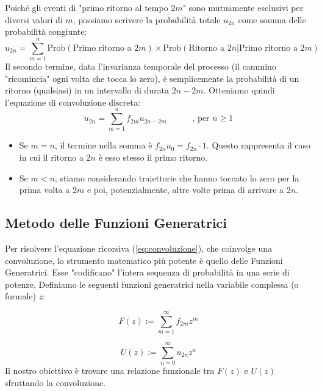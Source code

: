 \noindent Poiché gli eventi di "primo ritorno al tempo $2m$" sono mutuamente esclusivi per diversi valori di $m$, possiamo scrivere la probabilità totale $u_{2n}$ come somma delle probabilità congiunte:
\begin{equation}
    u_{2n} = \sum_{m=1}^{n} \text{Prob}(\text{Primo ritorno a } 2m) \times \text{Prob}(\text{Ritorno a } 2n | \text{Primo ritorno a } 2m)
\end{equation}
Il secondo termine, data l'invarianza temporale del processo (il cammino "ricomincia" ogni volta che tocca lo zero), è semplicemente la probabilità di un ritorno (qualsiasi) in un intervallo di durata $2n-2m$. Otteniamo quindi l'equazione di convoluzione discreta:
\begin{equation} \label{eq:convoluzione}
    u_{2n} = \sum_{m=1}^{n} f_{2m} u_{2n-2m} \quad \quad \quad  \text{, per } n \ge 1
\end{equation}

\begin{itemize}
    \item Se $m=n$, il termine nella somma è $f_{2n} u_0 = f_{2n} \cdot 1$. Questo rappresenta il caso in cui il ritorno a $2n$ è esso stesso il primo ritorno.
    \item Se $m < n$, stiamo considerando traiettorie che hanno toccato lo zero per la prima volta a $2m$ e poi, potenzialmente, altre volte prima di arrivare a $2n$.
\end{itemize}

\subsection{Metodo delle Funzioni Generatrici}

Per risolvere l'equazione ricorsiva (\ref{eq:convoluzione}), che coinvolge una convoluzione, lo strumento matematico più potente è quello delle Funzioni Generatrici. Esse "codificano" l'intera sequenza di probabilità in una serie di potenze.
Definiamo le seguenti funzioni generatrici nella variabile complessa (o formale) $z$:

\begin{equation}
    F(z) := \sum_{m=1}^{\infty} f_{2m} z^m
\end{equation}

\begin{equation}
    U(z) := \sum_{n=0}^{\infty} u_{2n} z^n
\end{equation}
Il nostro obiettivo è trovare una relazione funzionale tra $F(z)$ e $U(z)$ sfruttando la convoluzione.

